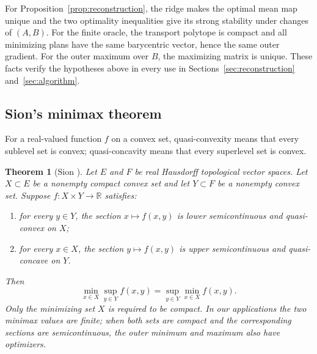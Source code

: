 \documentclass[11pt]{article}
\newcommand{\R}{\mathbb R}
\theoremstyle{plain}
\newtheorem{theorem}{Theorem}[section]
\theoremstyle{definition}
\theoremstyle{remark}
\begin{document}
For Proposition~\ref{prop:reconstruction}, the ridge makes the optimal mean map
unique and the two optimality inequalities give its strong stability under
changes of $(A,B)$. For the finite oracle, the transport polytope is compact and
all minimizing plans have the same barycentric vector, hence the same outer
gradient. For the outer maximum over $B$, the maximizing matrix is unique. These
facts verify the hypotheses above in every use in Sections~\ref{sec:reconstruction}
and~\ref{sec:algorithm}.

\subsection{Sion's minimax theorem}\label{subsec:sion}

For a real-valued function $f$ on a convex set, quasi-convexity means that every
sublevel set is convex; quasi-concavity means that every superlevel set is convex.

\begin{theorem}[Sion \cite{Sion}]
Let $E$ and $F$ be real Hausdorff topological vector spaces. Let
$X\subset E$ be a nonempty compact convex set and let $Y\subset F$ be a nonempty
convex set. Suppose $f:X\times Y\to\R$ satisfies:
\begin{enumerate}[label=(\roman*),leftmargin=2em]
\item for every $y\in Y$, the section $x\mapsto f(x,y)$ is lower semicontinuous
and quasi-convex on $X$;
\item for every $x\in X$, the section $y\mapsto f(x,y)$ is upper semicontinuous
and quasi-concave on $Y$.
\end{enumerate}
Then
\[
 \min_{x\in X}\sup_{y\in Y}f(x,y)
 =\sup_{y\in Y}\min_{x\in X}f(x,y).
\]
Only the minimizing set $X$ is required to be compact. In our applications the
two minimax values are finite; when both sets are compact and the corresponding
sections are semicontinuous, the outer minimum and maximum also have optimizers.
\end{theorem}
\end{document}
